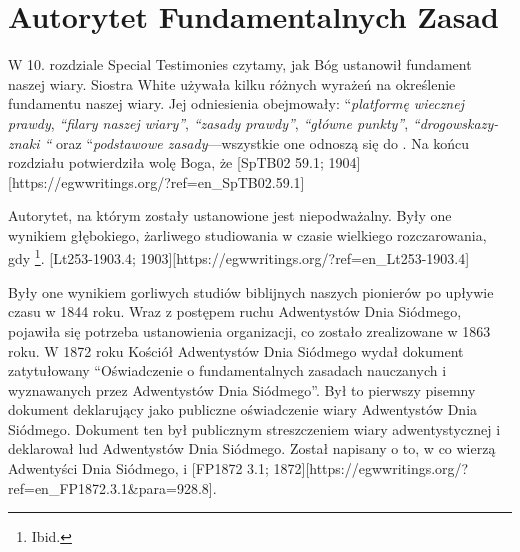 
\chapter{Autorytet Fundamentalnych Zasad} \label{chap:authority}

W 10. rozdziale Special Testimonies czytamy, jak Bóg ustanowił fundament naszej wiary. Siostra White używała kilku różnych wyrażeń na określenie fundamentu naszej wiary. Jej odniesienia obejmowały: “\textit{platformę wiecznej prawdy}, \textit{“filary naszej wiary”}, \textit{“zasady prawdy”}, \textit{“główne punkty”}, \textit{“drogowskazy- znaki “} oraz “\textit{podstawowe zasady}—wszystkie one odnoszą się do . Na końcu rozdziału potwierdziła wolę Boga, że [SpTB02 59.1; 1904][https://egwwritings.org/?ref=en\_SpTB02.59.1]

Autorytet, na którym zostały ustanowione  jest niepodważalny. Były one wynikiem głębokiego, żarliwego studiowania w czasie wielkiego rozczarowania, gdy \footnote{Ibid.}. [Lt253-1903.4; 1903][https://egwwritings.org/?ref=en\_Lt253-1903.4]

Były one wynikiem gorliwych studiów biblijnych naszych pionierów po upływie czasu w 1844 roku. Wraz z postępem ruchu Adwentystów Dnia Siódmego, pojawiła się potrzeba ustanowienia organizacji, co zostało zrealizowane w 1863 roku. W 1872 roku Kościół Adwentystów Dnia Siódmego wydał dokument zatytułowany “Oświadczenie o fundamentalnych zasadach nauczanych i wyznawanych przez Adwentystów Dnia Siódmego”. Był to pierwszy pisemny dokument deklarujący  jako publiczne oświadczenie wiary Adwentystów Dnia Siódmego. Dokument ten był publicznym streszczeniem wiary adwentystycznej i deklarował  lud Adwentystów Dnia Siódmego. Został napisany  o to, w co wierzą Adwentyści Dnia Siódmego,  i [FP1872 3.1; 1872][https://egwwritings.org/?ref=en\_FP1872.3.1&para=928.8].

